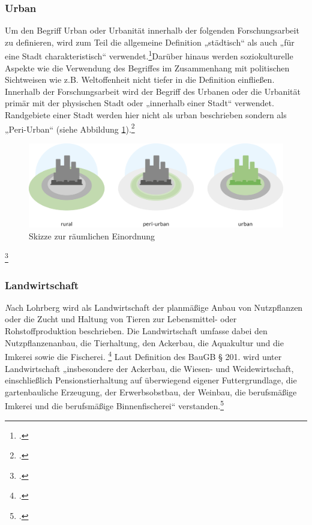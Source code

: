 \documentclass{scrartcl}
\begin{document}
\subsubsection{Urban}
Um den Begriff Urban oder Urbanität innerhalb der folgenden Forschungsarbeit zu definieren, wird zum Teil die allgemeine Definition „städtisch“ als auch „für eine Stadt charakteristisch“ verwendet.\footcite[Vgl.]{DUDEN}Darüber hinaus werden soziokulturelle Aspekte wie die Verwendung des Begriffes im Zusammenhang mit politischen Sichtweisen wie z.B. Weltoffenheit nicht tiefer in die Definition einfließen. Innerhalb der Forschungsarbeit wird der Begriff des Urbanen oder die Urbanität primär mit der physischen Stadt oder „innerhalb einer Stadt“ verwendet. Randgebiete einer Stadt werden hier nicht als urban beschrieben sondern als „Peri-Urban“ (siehe Abbildung \ref{fig:urbaneEingrenzung}).\footcite[S. 140]{MullerUrbanStadt}
\begin{flushright}
[MS]
\end{flushright}
\begin{figure}[htbp]
\centering
\includegraphics[width=12cm]{image_folder/SchaubildUrbaneEingrenzungen.png}
\caption{Skizze zur räumlichen Einordnung}
\label{fig:urbaneEingrenzung}
\end{figure}
\footcite[]{Eigene Zeichnung, entstanden aus dem Vorbild von Carlos Tobisch, Oasen im Beton S.26, Abb.7}

\subsubsection{Landwirtschaft}\textit
Nach Lohrberg wird als Landwirtschaft der planmäßige Anbau von Nutzpflanzen oder die Zucht und Haltung von Tieren zur Lebensmittel- oder Rohstoffproduktion beschrieben. Die Landwirtschaft umfasse dabei den Nutzpflanzenanbau, die Tierhaltung, den Ackerbau, die Aquakultur und die Imkerei sowie die Fischerei. \footcite[S. 5]{Lohrberg2001StadtnaheFreiraumplanung} Laut Definition des BauGB § 201. wird unter Landwirtschaft „insbesondere der Ackerbau, die Wiesen- und Weidewirtschaft, einschließlich Pensionstierhaltung auf überwiegend eigener Futtergrundlage, die gartenbauliche Erzeugung, der Erwerbsobstbau, der Weinbau, die berufsmäßige Imkerei und die berufsmäßige Binnenfischerei“ verstanden.\footcite[Vgl.][§ 201]{Deutschland2017Baugesetzbuch}
\end{document}
